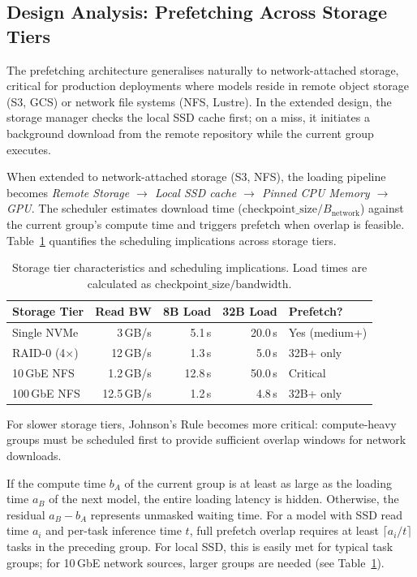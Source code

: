 \documentclass[logo,bsc,singlespacing,parskip,online]{infthesis}
\begin{document}
\subsection{Design Analysis: Prefetching Across Storage Tiers}
\label{sec:prefetch_storage_tiers}

The prefetching architecture generalises naturally to network-attached storage, critical for production deployments where models reside in remote object storage (S3, GCS) or network file systems (NFS, Lustre). In the extended design, the storage manager checks the local SSD cache first; on a miss, it initiates a background download from the remote repository while the current group executes.

When extended to network-attached storage (S3, NFS), the loading pipeline becomes \textit{Remote Storage $\to$ Local SSD cache $\to$ Pinned CPU Memory $\to$ GPU}. The scheduler estimates download time ($\text{checkpoint\_size} / B_{\text{network}}$) against the current group's compute time and triggers prefetch when overlap is feasible. Table~\ref{tab:storage_bandwidth} quantifies the scheduling implications across storage tiers.

\begin{table}[htbp]
\centering
\caption{Storage tier characteristics and scheduling implications. Load times are calculated as $\text{checkpoint\_size} / \text{bandwidth}$.}
\label{tab:storage_bandwidth}
\begin{tabular}{lrrrl}
\toprule
Storage Tier & Read BW & 8B Load & 32B Load & Prefetch? \\
\midrule
Single NVMe & 3\,GB/s & 5.1\,s & 20.0\,s & Yes (medium+) \\
RAID-0 (4$\times$) & 12\,GB/s & 1.3\,s & 5.0\,s & 32B+ only \\
10\,GbE NFS & 1.2\,GB/s & 12.8\,s & 50.0\,s & Critical \\
100\,GbE NFS & 12.5\,GB/s & 1.2\,s & 4.8\,s & 32B+ only \\
\bottomrule
\end{tabular}
\end{table}

For slower storage tiers, Johnson's Rule becomes more critical: compute-heavy groups must be scheduled first to provide sufficient overlap windows for network downloads.

If the compute time $b_A$ of the current group is at least as large as the loading time $a_B$ of the next model, the entire loading latency is hidden. Otherwise, the residual $a_B - b_A$ represents unmasked waiting time. For a model with SSD read time $a_i$ and per-task inference time $t$, full prefetch overlap requires at least $\lceil a_i / t \rceil$ tasks in the preceding group. For local SSD, this is easily met for typical task groups; for 10\,GbE network sources, larger groups are needed (see Table~\ref{tab:storage_bandwidth}).
\end{document}
